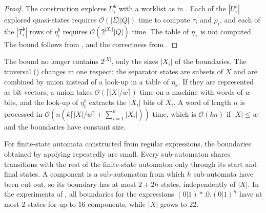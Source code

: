 \begin{proof}
  The construction explores $U_i^b$ with a worklist as in
  . Each of the $|U_i^b|$ explored quasi-states requires
  $\mathcal{O}(|\Sigma| |Q|)$ time to compute $\tau_i$ and $\rho_i$, and each of the
  $|T_i^b|$ rows of $\eta_i^b$ requires $\mathcal{O}(2^{|X_i|} |Q|)$ time. The table of
  $\eta_x$ is not computed. The bound follows from , and the
  correctness from .
\end{proof}

The bound no longer contains $2^{|X|}$, only the sizes $|X_i|$ of the boundaries. The
traversal () changes in one respect: the separator states are
subsets of $X$ and are combined by union instead of a look-up in a table of $\eta_x$. If they
are represented as bit vectors, a union takes $\mathcal{O}(\lceil |X| / w \rceil)$ time on a
machine with words of $w$ bits, and the look-up of $\eta_i^b$ extracts the $|X_i|$ bits of
$X_i$. A word of length $n$ is processed in $\mathcal{O}(n (k \lceil |X| / w \rceil +
\sum_{i=1}^k |X_i|))$ time, which is $\mathcal{O}(kn)$ if $|X| \leq w$ and the boundaries
have constant size.

For finite-state automata constructed from regular expressions, the boundaries obtained by
applying  repeatedly are small. Every sub-automaton shares
transitions with the rest of the finite-state automaton only through its start and final
states. A component is a sub-automaton from which $h$ sub-automata have been cut out, so its
boundary has at most $2 + 2h$ states, independently of $|X|$. In the experiments of
, all boundaries for the expressions $(0|1)*.0.(0|1)^n$ have
at most $2$ states for up to $16$ components, while $|X|$ grows to $22$.
